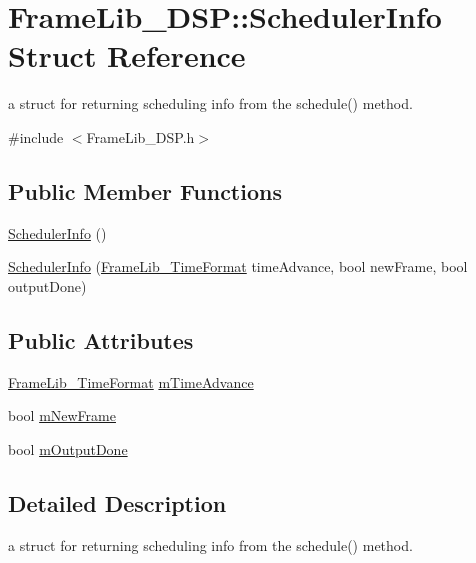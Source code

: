 \hypertarget{struct_frame_lib___d_s_p_1_1_scheduler_info}{}\section{Frame\+Lib\+\_\+\+D\+SP\+:\+:Scheduler\+Info Struct Reference}
\label{struct_frame_lib___d_s_p_1_1_scheduler_info}


a struct for returning scheduling info from the schedule() method.  




{\ttfamily \#include $<$Frame\+Lib\+\_\+\+D\+S\+P.\+h$>$}

\subsection*{Public Member Functions}
\begin{DoxyCompactItemize}
\item 
\hyperlink{struct_frame_lib___d_s_p_1_1_scheduler_info_a5939a752d4ea50eea67c019805254a82}{Scheduler\+Info} ()
\item 
\hyperlink{struct_frame_lib___d_s_p_1_1_scheduler_info_a82a4ba6533c2d663620c4276b7d27dce}{Scheduler\+Info} (\hyperlink{struct_frame_lib___time_format}{Frame\+Lib\+\_\+\+Time\+Format} time\+Advance, bool new\+Frame, bool output\+Done)
\end{DoxyCompactItemize}
\subsection*{Public Attributes}
\begin{DoxyCompactItemize}
\item 
\hyperlink{struct_frame_lib___time_format}{Frame\+Lib\+\_\+\+Time\+Format} \hyperlink{struct_frame_lib___d_s_p_1_1_scheduler_info_ae38d8335efc201f8c2c967ffea7b6076}{m\+Time\+Advance}
\item 
bool \hyperlink{struct_frame_lib___d_s_p_1_1_scheduler_info_a88fa8b1c2060d60f4ae1cf164405c85f}{m\+New\+Frame}
\item 
bool \hyperlink{struct_frame_lib___d_s_p_1_1_scheduler_info_aee41d636cde5b117b4ce8610905d668d}{m\+Output\+Done}
\end{DoxyCompactItemize}


\subsection{Detailed Description}
a struct for returning scheduling info from the schedule() method. 

